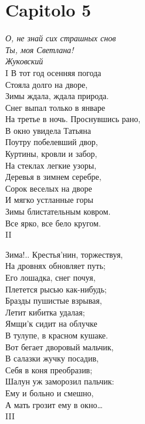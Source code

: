 \chapter{Capitolo 5} %
\label{cap5} %

\textit{О, не знай сих страшных снов\\
Ты, моя Светлана!\\
Жуковский
}\\

I
В тот год осенняя погода\\
Стояла долго на дворе,\\
Зимы ждала, ждала природа.\\
Снег выпал только в январе\\
На третье в ночь. Проснувшись рано,\\
В окно увидела Татьяна\\
Поутру побелевший двор,\\
Куртины, кровли и забор,\\
На стеклах легкие узоры,\\
Деревья в зимнем серебре,\\
Сорок веселых на дворе\\
И мягко устланные горы\\
Зимы блистательным ковром.\\
Все ярко, все бело кругом.\\

II

Зима!.. Крестья'нин, торжествуя,\\
На дровнях обновляет путь;\\
Его лошадка, снег почуя,\\
Плетется рысью как-нибудь;\\
Бразды пушистые взрывая,\\
Летит кибитка удалая;\\
Ямщи'к сидит на облучке\\
В тулупе, в красном кушаке.\\
Вот бегает дворовый мальчик,\\
В салазки жучку посадив,\\
Себя в коня преобразив;\\
Шалун уж заморозил пальчик:\\
Ему и больно и смешно,\\
А мать грозит ему в окно…\\

III

